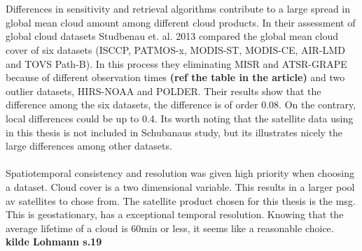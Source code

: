 \\ \\
Differences in sensitivity and retrieval algorithms contribute to a large spread in global mean cloud amount among different cloud products. In their assessment of global cloud datasets Studbenau et. al. 2013 compared the global mean cloud cover of six datasets (ISCCP, PATMOS-x, MODIS-ST, MODIS-CE, AIR-LMD and TOVS Path-B). In this process they eliminating MISR and ATSR-GRAPE because of different observation times \textbf{(ref the table in the article)} and two outlier datasets, HIRS-NOAA and POLDER. Their results show that the difference among the six datasets, the difference is of order 0.08. On the contrary, local differences could be up to 0.4. Its worth noting that the satellite data using in this thesis is not included in Schubanaus study, but its illustrates nicely the large differences among other datasets. 
\\ \\ 
Spatiotemporal consistency and resolution was given high priority when choosing a dataset. %
Cloud cover is a two dimensional variable. This results in a larger pool av satellites to chose from. The satellite product chosen for this thesis is the \acrfull{msg}. This is geostationary, has a exceptional temporal resolution. Knowing that the average lifetime of a cloud is 60min or less, it seems like a reasonable choice. \textbf{kilde Lohmann s.19}
\\ \\
